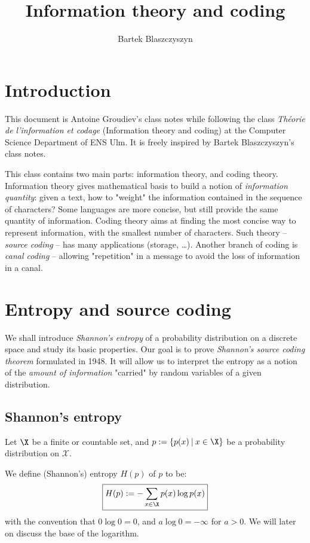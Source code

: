 \documentclass[toc, titlepaged]{../cs-classes/cs-classes}
\title{Information theory and coding}
\author{Bartek Blaszczyszyn}
\begin{document}
\section*{Introduction}
This document is Antoine Groudiev's class notes while following the class \emph{Théorie de l'information et codage} (Information theory and coding) at the Computer Science Department of ENS Ulm. It is freely inspired by Bartek Blaszczyszyn's class notes. 

This class contains two main parts: information theory, and coding theory. Information theory gives mathematical basis to build a notion of \emph{information quantity}: given a text, how to "weight" the information contained in the sequence of characters? Some languages are more concise, but still provide the same quantity of information. Coding theory aims at finding the most concise way to represent information, with the smallest number of characters. Such theory -- \emph{source coding} -- has many applications (storage, \dots). Another branch of coding is \emph{canal coding} -- allowing "repetition" in a message to avoid the loss of information in a canal.

\section{Entropy and source coding}
We shall introduce \emph{Shannon’s entropy} of a probability distribution on a discrete space and study its basic properties. Our goal is to prove \emph{Shannon’s source coding theorem} formulated in 1948. It will allow us to interpret the entropy as a notion of the \emph{amount of information} "carried" by random variables of a given distribution.

\subsection{Shannon's entropy}
Let $\X$ be a finite or countable set, and $p := \{p(x) \: | \: x\in \X \}$ be a probability distribution on $\mathcal{X}$.

\begin{definition} We define (Shannon's) entropy $H(p)$ of $p$ to be:
\begin{equation}
    \boxed{H(p) := -\sum_{x\in\X}p(x)\log p(x)}
\end{equation}
with the convention that $0\log 0 = 0$, and $a\log 0 = -\infty$ for $a>0$.
We will later on discuss the base of the logarithm.
\end{definition}
\end{document}
